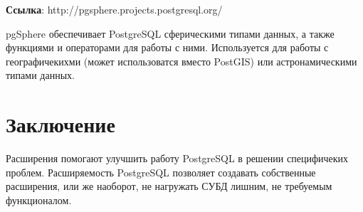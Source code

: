 \textbf{Ссылка}: http://pgsphere.projects.postgresql.org/

pgSphere обеспечивает PostgreSQL сферическими типами данных, а также функциями и операторами для работы с ними. 
Используется для работы с географичекихми (может использоватся вместо PostGIS) или астронамическими типами данных.

\section{Заключение}
Расширения помогают улучшить работу PostgreSQL в решении специфичеких проблем. Расширяемость PostgreSQL позволяет создавать собственные расширения, 
или же наоборот, не нагружать СУБД лишним, не требуемым функционалом.